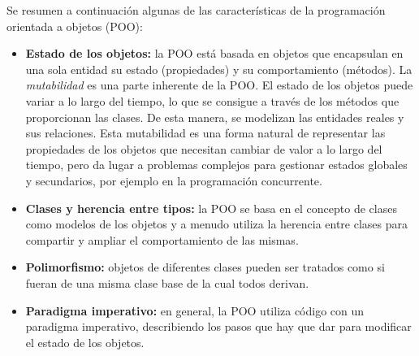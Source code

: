 Se resumen a continuación algunas de las características de la programación orientada a objetos (POO):
\begin{itemize}
   \item \textbf{Estado de los objetos:} la POO está basada en objetos que encapsulan en una sola entidad su estado (propiedades) y su comportamiento (métodos). La \textit{mutabilidad} es una parte inherente de la POO. El estado de los objetos puede variar a lo largo del tiempo, lo que se consigue a través de los métodos que proporcionan las clases. De esta manera, se modelizan las entidades reales y sus relaciones. Esta mutabilidad es una forma natural de representar las propiedades de los objetos que necesitan cambiar de valor a lo largo del tiempo, pero da lugar a problemas complejos para gestionar estados globales y secundarios, por ejemplo en la programación concurrente.

   \vspace{0.5em}

   \item \textbf{Clases y herencia entre tipos:} la POO se basa en el concepto de clases como modelos de los objetos y a menudo utiliza la herencia entre clases para compartir y ampliar el comportamiento de las mismas.

   \vspace{0.5em}
   
   \item \textbf{Polimorfismo:} objetos de diferentes clases pueden ser tratados como si fueran de una misma clase base de la cual todos derivan.
   
   \vspace{0.5em}
      
   \item \textbf{Paradigma imperativo:} en general, la POO utiliza código con un paradigma imperativo, describiendo los pasos que hay que dar para modificar el estado de los objetos.
\end{itemize}

